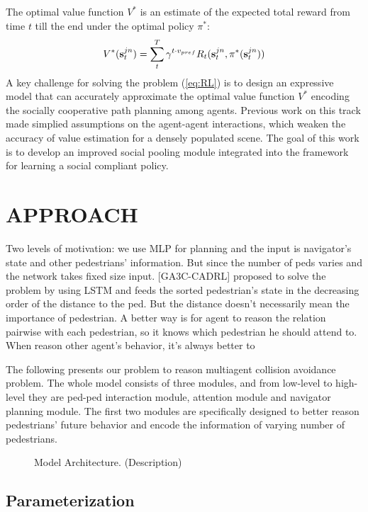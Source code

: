 \documentclass[letterpaper, 10 pt, conference]{ieeeconf}  %
\begin{document}
The optimal value function $V^*$ is an estimate of the expected total reward from time $t$ till the end under the optimal policy $\pi^*$: 
\begin{equation}
V^*(\bold{s}_t^{jn}) = \sum_{t}^T \gamma^{t \cdot v_{pref}} R_t(\bold{s}_t^{jn},\pi^*(\bold{s}_t^{jn}))
\end{equation}
A key challenge for solving the problem (\ref{eq:RL}) is to design an expressive model that can accurately approximate the optimal value function $V^{*}$ encoding the socially cooperative path planning among agents. Previous work on this track made simplied assumptions on the agent-agent interactions, which weaken the accuracy of value estimation for a densely populated scene. The goal of this work is to develop an improved social pooling module integrated into the framework for learning a social compliant policy. 

\section{APPROACH} \label{sec:approach} 
Two levels of motivation: we use MLP for planning and the input is navigator's state and other pedestrians' information. But since the number of peds varies and the network takes fixed size input. [GA3C-CADRL] proposed to solve the problem by using LSTM and feeds the sorted pedestrian's state in the decreasing order of the distance to the ped. But the distance doesn't necessarily mean the importance of pedestrian. A better way is for agent to reason the relation pairwise with each pedestrian, so it knows which pedestrian he should attend to. When reason other agent's behavior, it's always better to  

The following presents our problem to reason multiagent collision avoidance problem. The whole model consists of three modules, and from low-level to high-level they are ped-ped interaction module, attention module and navigator planning module. The first two modules are specifically designed to better reason pedestrians' future behavior and encode the information of varying number of pedestrians.

\begin{figure}[thpb]
  \centering
  \caption{Model Architecture. (Description)}
  \label{figurelabel}
\end{figure}

\subsection{Parameterization}
\end{document}
